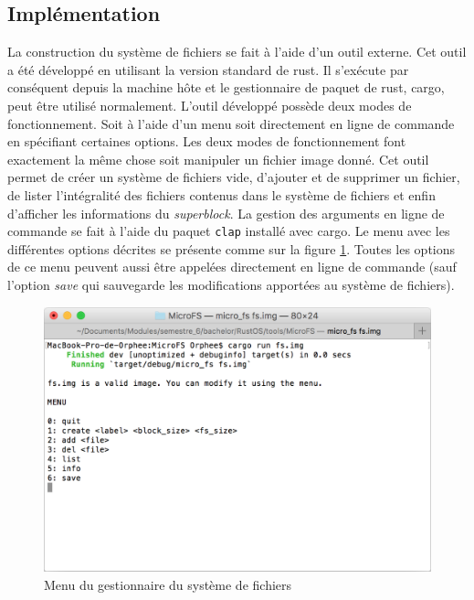 
\subsection{Implémentation}
La construction du système de fichiers se fait à l'aide d'un outil externe. Cet
outil a été développé en utilisant la version standard de rust. Il s'exécute
par conséquent depuis la machine hôte et le gestionnaire de paquet de rust, cargo,
peut être utilisé normalement. L'outil développé possède deux
modes de fonctionnement. Soit à l'aide d'un menu soit directement en ligne de
commande en spécifiant certaines options. Les deux modes de fonctionnement
font exactement la même chose soit manipuler un fichier image donné. Cet outil permet
de créer un système de fichiers vide, d'ajouter et de supprimer un fichier, de
lister l'intégralité des fichiers contenus dans le système de fichiers et enfin
d'afficher les informations du \textit{superblock}. La gestion des arguments en
ligne de commande se fait à l'aide du paquet \texttt{clap} installé avec
cargo. Le menu avec les différentes options décrites se présente comme sur la figure
\ref{microfs_menu}. Toutes les options de ce menu peuvent aussi être appelées
directement en ligne de commande (sauf l'option \textit{save} qui sauvegarde les
modifications apportées au système de fichiers). \\ 

\begin{figure}[!h]
  \centering
  \includegraphics[scale=0.6]{images/microfs_menu.png}
  \caption{Menu du gestionnaire du système de fichiers}
  \label{microfs_menu}
\end{figure}


